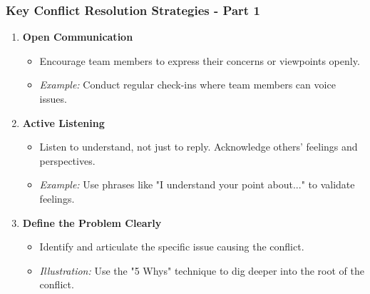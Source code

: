 \documentclass[aspectratio=169]{beamer}
\begin{document}
\begin{frame}[fragile]
    \frametitle{Key Conflict Resolution Strategies - Part 1}
    \begin{enumerate}
        \item \textbf{Open Communication}
            \begin{itemize}
                \item Encourage team members to express their concerns or viewpoints openly.
                \item \textit{Example:} Conduct regular check-ins where team members can voice issues.
            \end{itemize}
        \item \textbf{Active Listening}
            \begin{itemize}
                \item Listen to understand, not just to reply. Acknowledge others' feelings and perspectives.
                \item \textit{Example:} Use phrases like "I understand your point about..." to validate feelings.
            \end{itemize}
        \item \textbf{Define the Problem Clearly}
            \begin{itemize}
                \item Identify and articulate the specific issue causing the conflict.
                \item \textit{Illustration:} Use the "5 Whys" technique to dig deeper into the root of the conflict.
            \end{itemize}
    \end{enumerate}
\end{frame}
\end{document}
